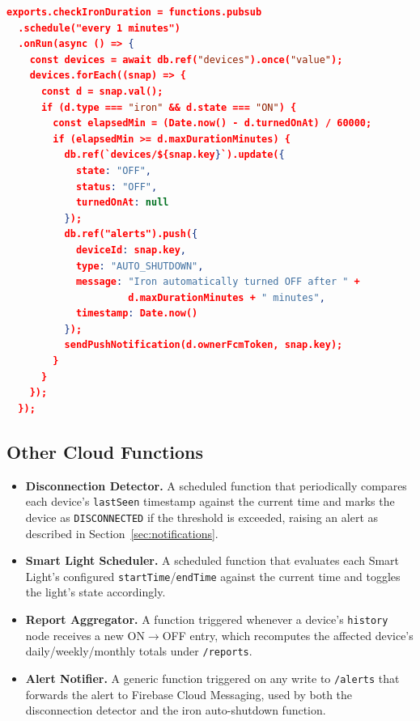 \documentclass[11pt,a4paper]{article}
\begin{document}
\begin{lstlisting}[language=json,caption={Simplified pseudocode for the iron auto-shutdown Cloud Function.},label={lst:cloud-function-pseudo}]
exports.checkIronDuration = functions.pubsub
  .schedule("every 1 minutes")
  .onRun(async () => {
    const devices = await db.ref("devices").once("value");
    devices.forEach((snap) => {
      const d = snap.val();
      if (d.type === "iron" && d.state === "ON") {
        const elapsedMin = (Date.now() - d.turnedOnAt) / 60000;
        if (elapsedMin >= d.maxDurationMinutes) {
          db.ref(`devices/${snap.key}`).update({
            state: "OFF",
            status: "OFF",
            turnedOnAt: null
          });
          db.ref("alerts").push({
            deviceId: snap.key,
            type: "AUTO_SHUTDOWN",
            message: "Iron automatically turned OFF after " +
                     d.maxDurationMinutes + " minutes",
            timestamp: Date.now()
          });
          sendPushNotification(d.ownerFcmToken, snap.key);
        }
      }
    });
  });
\end{lstlisting}

\subsection{Other Cloud Functions}
\begin{itemize}
    \item \textbf{Disconnection Detector.} A scheduled function that periodically compares each device's \texttt{lastSeen} timestamp against the current time and marks the device as \texttt{DISCONNECTED} if the threshold is exceeded, raising an alert as described in Section~\ref{sec:notifications}.
    \item \textbf{Smart Light Scheduler.} A scheduled function that evaluates each Smart Light's configured \texttt{startTime}/\texttt{endTime} against the current time and toggles the light's state accordingly.
    \item \textbf{Report Aggregator.} A function triggered whenever a device's \texttt{history} node receives a new ON$\to$OFF entry, which recomputes the affected device's daily/weekly/monthly totals under \texttt{/reports}.
    \item \textbf{Alert Notifier.} A generic function triggered on any write to \texttt{/alerts} that forwards the alert to Firebase Cloud Messaging, used by both the disconnection detector and the iron auto-shutdown function.
\end{itemize}
\end{document}

